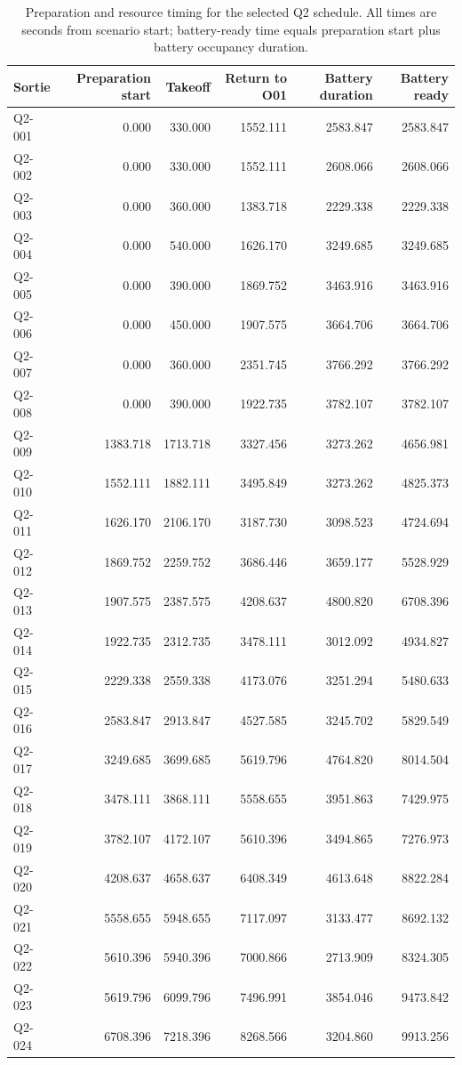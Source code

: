 \documentclass[11pt,a4paper]{article}
\begin{document}
\begin{table}[H]
\centering\scriptsize
\caption{Preparation and resource timing for the selected Q2 schedule. All times are seconds from scenario start; battery-ready time equals preparation start plus battery occupancy duration.}
\label{tab:q2-timing}
\begin{tabular}{@{}lrrrrr@{}}
\toprule
Sortie & Preparation start & Takeoff & Return to O01 & Battery duration & Battery ready\\
\midrule
Q2-001 & 0.000 & 330.000 & 1552.111 & 2583.847 & 2583.847\\
Q2-002 & 0.000 & 330.000 & 1552.111 & 2608.066 & 2608.066\\
Q2-003 & 0.000 & 360.000 & 1383.718 & 2229.338 & 2229.338\\
Q2-004 & 0.000 & 540.000 & 1626.170 & 3249.685 & 3249.685\\
Q2-005 & 0.000 & 390.000 & 1869.752 & 3463.916 & 3463.916\\
Q2-006 & 0.000 & 450.000 & 1907.575 & 3664.706 & 3664.706\\
Q2-007 & 0.000 & 360.000 & 2351.745 & 3766.292 & 3766.292\\
Q2-008 & 0.000 & 390.000 & 1922.735 & 3782.107 & 3782.107\\
Q2-009 & 1383.718 & 1713.718 & 3327.456 & 3273.262 & 4656.981\\
Q2-010 & 1552.111 & 1882.111 & 3495.849 & 3273.262 & 4825.373\\
Q2-011 & 1626.170 & 2106.170 & 3187.730 & 3098.523 & 4724.694\\
Q2-012 & 1869.752 & 2259.752 & 3686.446 & 3659.177 & 5528.929\\
Q2-013 & 1907.575 & 2387.575 & 4208.637 & 4800.820 & 6708.396\\
Q2-014 & 1922.735 & 2312.735 & 3478.111 & 3012.092 & 4934.827\\
Q2-015 & 2229.338 & 2559.338 & 4173.076 & 3251.294 & 5480.633\\
Q2-016 & 2583.847 & 2913.847 & 4527.585 & 3245.702 & 5829.549\\
Q2-017 & 3249.685 & 3699.685 & 5619.796 & 4764.820 & 8014.504\\
Q2-018 & 3478.111 & 3868.111 & 5558.655 & 3951.863 & 7429.975\\
Q2-019 & 3782.107 & 4172.107 & 5610.396 & 3494.865 & 7276.973\\
Q2-020 & 4208.637 & 4658.637 & 6408.349 & 4613.648 & 8822.284\\
Q2-021 & 5558.655 & 5948.655 & 7117.097 & 3133.477 & 8692.132\\
Q2-022 & 5610.396 & 5940.396 & 7000.866 & 2713.909 & 8324.305\\
Q2-023 & 5619.796 & 6099.796 & 7496.991 & 3854.046 & 9473.842\\
Q2-024 & 6708.396 & 7218.396 & 8268.566 & 3204.860 & 9913.256\\
\bottomrule
\end{tabular}
\end{table}
\end{document}
